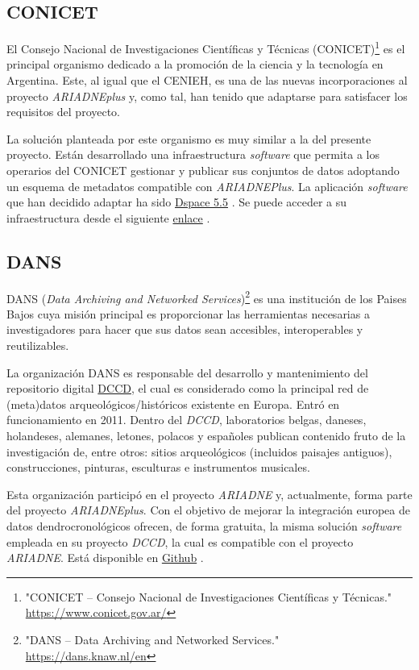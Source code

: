 \documentclass[
]{article}
\begin{document}
\hypertarget{conicet}{%
\subsection{CONICET}\label{conicet}}

El Consejo Nacional de Investigaciones Científicas y Técnicas
(CONICET)\footnote{"CONICET -- Consejo Nacional de Investigaciones
  Científicas y Técnicas." \url{https://www.conicet.gov.ar/}} es el
principal organismo dedicado a la promoción de la ciencia y la
tecnología en Argentina. Este, al igual que el CENIEH, es una de las
nuevas incorporaciones al proyecto \emph{ARIADNEplus} y, como tal, han
tenido que adaptarse para satisfacer los requisitos del proyecto.

La solución planteada por este organismo es muy similar a la del
presente proyecto. Están desarrollado una infraestructura
\emph{software} que permita a los operarios del CONICET gestionar y
publicar sus conjuntos de datos adoptando un esquema de metadatos
compatible con \emph{ARIADNEPlus}. La aplicación \emph{software} que han
decidido adaptar ha sido \href{https://duraspace.org/dspace/}{Dspace
5.5} . Se puede acceder a su infraestructura desde el siguiente
\href{https://suquia.ffyh.unc.edu.ar/}{enlace} .

\hypertarget{dans}{%
\subsection{DANS}\label{dans}}

DANS (\emph{Data Archiving and Networked Services})\footnote{"DANS --
  Data Archiving and Networked Services." \url{https://dans.knaw.nl/en}}
es una institución de los Paises Bajos cuya misión principal es
proporcionar las herramientas necesarias a investigadores para hacer que
sus datos sean accesibles, interoperables y reutilizables.

La organización DANS es responsable del desarrollo y mantenimiento del
repositorio digital \href{https://dendro.dans.knaw.nl/}{DCCD}, el cual
es considerado como la principal red de (meta)datos
arqueológicos/históricos existente en Europa. Entró en funcionamiento en
2011. Dentro del \emph{DCCD}, laboratorios belgas, daneses, holandeses,
alemanes, letones, polacos y españoles publican contenido fruto de la
investigación de, entre otros: sitios arqueológicos (incluidos paisajes
antiguos), construcciones, pinturas, esculturas e instrumentos
musicales.

Esta organización participó en el proyecto \emph{ARIADNE} y,
actualmente, forma parte del proyecto \emph{ARIADNEplus}. Con el
objetivo de mejorar la integración europea de datos dendrocronológicos
ofrecen, de forma gratuita, la misma solución \emph{software} empleada
en su proyecto \emph{DCCD}, la cual es compatible con el proyecto
\emph{ARIADNE}. Está disponible en
\href{https://github.com/DANS-KNAW/dccd-webui}{Github} .
\end{document}

